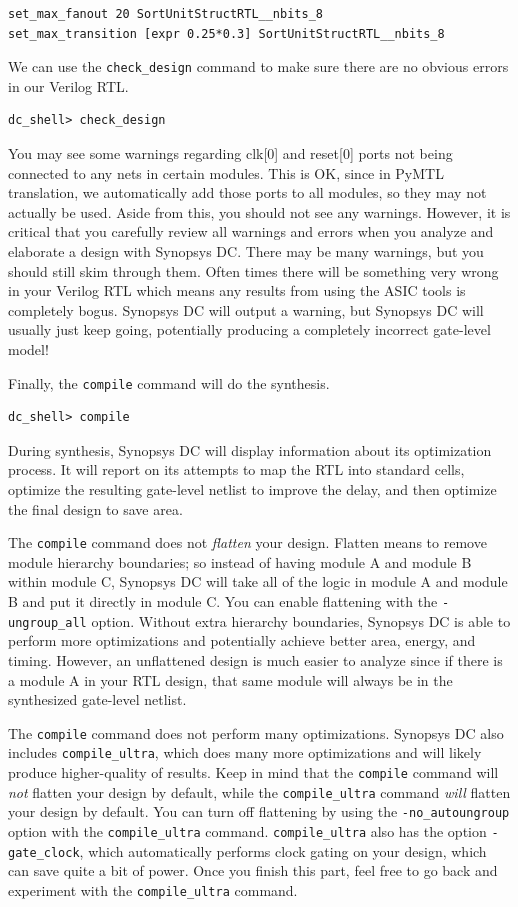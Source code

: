 \documentclass[a4paper,12pt,twoside]{article}
\begin{document}
\begin{verbatim}
set_max_fanout 20 SortUnitStructRTL__nbits_8
set_max_transition [expr 0.25*0.3] SortUnitStructRTL__nbits_8
\end{verbatim}
We can use the \texttt{check\_design} command to make sure there are no obvious errors in our Verilog RTL.
\begin{verbatim}
dc_shell> check_design
\end{verbatim}
You may see some warnings regarding clk[0] and reset[0] ports not being connected to any nets in certain modules. This is OK, since in PyMTL translation, we automatically add those ports to all modules, so they may not actually be used. Aside from this, you should not see any warnings. However, it is critical that you carefully review all warnings and errors when you analyze and elaborate a design with Synopsys DC. There may be many warnings, but you should still skim through them. Often times there will be something very wrong in your Verilog RTL which means any results from using the ASIC tools is completely bogus. Synopsys DC will output a warning, but Synopsys DC will usually just keep going, potentially producing a completely incorrect gate-level model!

Finally, the \texttt{compile} command will do the synthesis.
\begin{verbatim}
dc_shell> compile
\end{verbatim}
During synthesis, Synopsys DC will display information about its optimization process. It will report on its attempts to map the RTL into standard cells, optimize the resulting gate-level netlist to improve the delay, and then optimize the final design to save area.

The \texttt{compile} command does not \textit{flatten} your design. Flatten means to remove module hierarchy boundaries; so instead of having module A and module B within module C, Synopsys DC will take all of the logic in module A and module B and put it directly in module C. You can enable flattening with the \texttt{-ungroup\_all} option. Without extra hierarchy boundaries, Synopsys DC is able to perform more optimizations and potentially achieve better area, energy, and timing. However, an unflattened design is much easier to analyze since if there is a module A in your RTL design, that same module will always be in the synthesized gate-level netlist.

The \texttt{compile} command does not perform many optimizations. Synopsys DC also includes \texttt{compile\_ultra}, which does many more optimizations and will likely produce higher-quality of results. Keep in mind that the \texttt{compile} command will \textit{not} flatten your design by default, while the \texttt{compile\_ultra} command \textit{will} flatten your design by default. You can turn off flattening by using the \texttt{-no\_autoungroup} option with the \texttt{compile\_ultra} command. \texttt{compile\_ultra} also has the option \texttt{-gate\_clock}, which automatically performs clock gating on your design, which can save quite a bit of power. Once you finish this part, feel free to go back and experiment with the \texttt{compile\_ultra} command.
\end{document}
